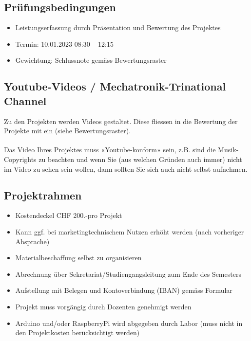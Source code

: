 \subsection*{Prüfungsbedingungen}
\begin{itemize}
    \item Leistungserfassung durch Präsentation und Bewertung des Projektes
    \item Termin: 10.01.2023	08:30 – 12:15
    \item Gewichtung: Schlussnote gemäss Bewertungsraster
\end{itemize}

\subsection*{Youtube-Videos / Mechatronik-Trinational Channel}
Zu den Projekten werden Videos gestaltet. Diese fliessen in die Bewertung der Projekte mit ein (siehe Bewertungsraster).\\
\\
Das Video Ihres Projektes muss «Youtube-konform» sein, z.B. sind die Musik-Copyrights zu beachten und wenn Sie (aus welchen Gründen auch immer) nicht im Video zu sehen sein wollen, dann sollten Sie sich auch nicht selbst aufnehmen.

\subsection*{Projektrahmen}
\begin{itemize}
    \item Kostendeckel CHF 200.-pro Projekt
    \item Kann ggf. bei marketingtechnischem Nutzen erhöht werden (nach vorheriger Absprache)
    \item Materialbeschaffung selbst zu organisieren
    \item Abrechnung über Sekretariat/Studiengangsleitung zum Ende des Semesters    
    \item Aufstellung mit Belegen und Kontoverbindung (IBAN) gemäss Formular
    \item Projekt muss vorgängig durch Dozenten genehmigt werden
    \item Arduino und/oder RaspberryPi wird abgegeben durch Labor (muss nicht in den Projektkosten berücksichtigt werden)
\end{itemize}

